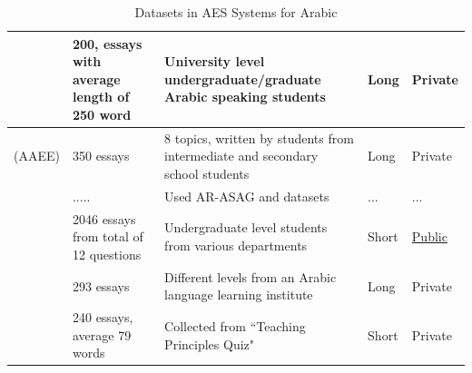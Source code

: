 \documentclass{article}
\begin{document}
\begin{table}[H]
\begin{tabularx}{6in}{|c|X|p{1.5in}|p{1cm}|p{1.5cm}|}
        \textcite{18_alqahtani2020svr} & 200, essays with average length of 250 word & University level undergraduate/graduate Arabic speaking students & Long & Private \\ \hline
        \textcite{20_azmi2019aaee} (AAEE) & 350 essays & 8 topics, written by students from intermediate and secondary school students & Long & Private \\ \hline
        \textcite{22_meccawy2023mining} & ..... & Used AR-ASAG \cite{ouahrani2020ar-asag} and \textcite{16_rababah2017short} datasets & ... & ... \\ \hline
        \textcite{23_ghazawi2024bert} & 2046 essays from total of 12 questions & Undergraduate level students from various departments & Short & \href{https://osf.io/dp2nh/?view_only=4ac6373c60214ea6952855f81507fec7}{Public} \\ \hline
        \textcite{26_alsanie2022threelevels} & 293 essays & Different levels from an Arabic language learning institute & Long & Private \\ \hline
        \textcite{27_gaheen2021jaya} & 240 essays, average 79 words & Collected from ``Teaching Principles Quiz" & Short & Private \\ \hline
    \end{tabularx}
    \caption{Datasets in AES Systems for Arabic}
    \label{arabicdatasets}
\end{table}
\end{document}
